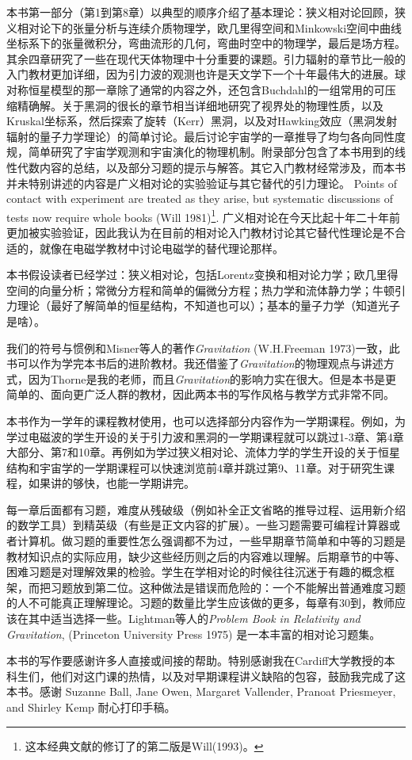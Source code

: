 本书第一部分（第1到第8章）以典型的顺序介绍了基本理论：狭义相对论回顾，狭义相对论下的张量分析与连续介质物理学，欧几里得空间和Minkowski空间中曲线坐标系下的张量微积分，弯曲流形的几何，弯曲时空中的物理学，最后是场方程。其余四章研究了一些在现代天体物理中十分重要的课题。引力辐射的章节比一般的入门教材更加详细，因为引力波的观测也许是天文学下一个十年最伟大的进展。球对称恒星模型的那一章除了通常的内容之外，还包含Buchdahl的一组常用的可压缩精确解。关于黑洞的很长的章节相当详细地研究了视界处的物理性质，以及Kruskal坐标系，然后探索了旋转（Kerr）黑洞，以及对Hawking效应（黑洞发射辐射的量子力学理论）的简单讨论。最后讨论宇宙学的一章推导了均匀各向同性度规，简单研究了宇宙学观测和宇宙演化的物理机制。附录部分包含了本书用到的线性代数内容的总结，以及部分习题的提示与解答。其它入门教材经常涉及，而本书并未特别讲述的内容是广义相对论的实验验证与其它替代的引力理论。 Points of contact with experiment are treated as they arise, but systematic discussions of tests now require whole books (Will 1981)\footnote{这本经典文献的修订了的第二版是Will(1993)。}. 广义相对论在今天比起十年二十年前更加被实验验证，因此我认为在目前的相对论入门教材讨论其它替代性理论是不合适的，就像在电磁学教材中讨论电磁学的替代理论那样。

本书假设读者已经学过：狭义相对论，包括Lorentz变换和相对论力学；欧几里得空间的向量分析；常微分方程和简单的偏微分方程；热力学和流体静力学；牛顿引力理论（最好了解简单的恒星结构，不知道也可以）；基本的量子力学（知道光子是啥）。

我们的符号与惯例和Misner等人的著作\textit{Gravitation} (W.H.Freeman 1973)一致，此书可以作为学完本书后的进阶教材。我还借鉴了\textit{Gravitation}的物理观点与讲述方式，因为Thorne是我的老师，而且\textit{Gravitation}的影响力实在很大。但是本书是更简单的、面向更广泛人群的教材，因此两本书的写作风格与教学方式非常不同。

本书作为一学年的课程教材使用，也可以选择部分内容作为一学期课程。例如，为学过电磁波的学生开设的关于引力波和黑洞的一学期课程就可以跳过1-3章、第4章大部分、第7和10章。再例如为学过狭义相对论、流体力学的学生开设的关于恒星结构和宇宙学的一学期课程可以快速浏览前4章并跳过第9、11章。对于研究生课程，如果讲的够快，也能一学期讲完。

每一章后面都有习题，难度从残破级（例如补全正文省略的推导过程、运用新介绍的数学工具）到精英级（有些是正文内容的扩展）。一些习题需要可编程计算器或者计算机。做习题的重要性怎么强调都不为过，一些早期章节简单和中等的习题是教材知识点的实际应用，缺少这些经历则之后的内容难以理解。后期章节的中等、困难习题是对理解效果的检验。学生在学相对论的时候往往沉迷于有趣的概念框架，而把习题放到第二位。这种做法是错误而危险的：一个不能解出普通难度习题的人不可能真正理解理论。习题的数量比学生应该做的更多，每章有30到，教师应该在其中适当选择一些。Lightman等人的\textit{Problem Book in Relativity and Gravitation}, (Princeton University Press 1975) 是一本丰富的相对论习题集。

本书的写作要感谢许多人直接或间接的帮助。特别感谢我在Cardiff大学教授的本科生们，他们对这门课的热情，以及对早期课程讲义缺陷的包容，鼓励我完成了这本书。感谢 Suzanne Ball, Jane Owen, Margaret Vallender, Pranoat Priesmeyer, and Shirley Kemp 耐心打印手稿。
